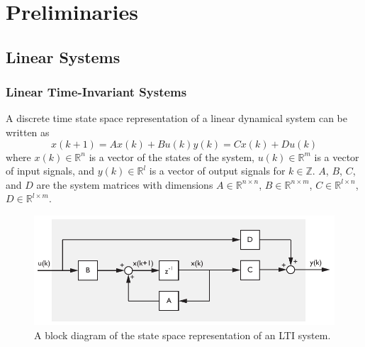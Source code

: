 \chapter{Preliminaries}

\section{Linear Systems}
\subsection{Linear Time-Invariant Systems}\label{sec:linear_time_invariant_systems}
A discrete time state space representation of a linear dynamical system can be written as
\begin{subequations}\label{eq:2_lti}
\begin{equation}x(k+1) = Ax(k) + Bu(k)\end{equation}
\begin{equation}y(k) = Cx(k) + Du(k)\end{equation}
\end{subequations}
where $x(k) \in \mathbb{R}^n$ is a vector of the states of the system, $u(k) \in \mathbb{R}^m$ is a vector of input signals, and $y(k) \in \mathbb{R}^l$ is a vector of output signals for $k \in \mathbb{Z}$. $A$, $B$, $C$, and $D$ are the system matrices with dimensions $A\in\mathbb{R}^{n\times n}$, $B\in\mathbb{R}^{n\times m}$, $C\in\mathbb{R}^{l\times n}$, $D\in\mathbb{R}^{l\times m}$.
\begin{figure}[htb!]
	\centering
	\includegraphics{../fig/lti_block_diagram.pdf}
	\caption{A block diagram of the state space representation of an LTI system.}
\end{figure}

